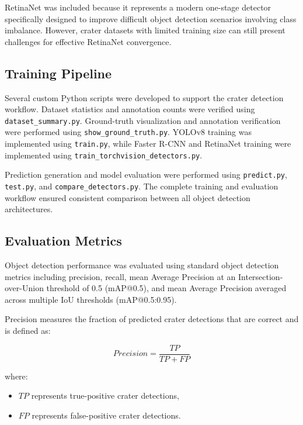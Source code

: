 \documentclass[conference]{IEEEtran}
\begin{document}
	RetinaNet was included because it represents a modern one-stage detector specifically designed to improve difficult object detection scenarios involving class imbalance. However, crater datasets with limited training size can still present challenges for effective RetinaNet convergence.
	
	\subsection{Training Pipeline}
	
	Several custom Python scripts were developed to support the crater detection workflow. Dataset statistics and annotation counts were verified using \texttt{dataset\_summary.py}. Ground-truth visualization and annotation verification were performed using \texttt{show\_ground\_truth.py}. YOLOv8 training was implemented using \texttt{train.py}, while Faster R-CNN and RetinaNet training were implemented using \texttt{train\_torchvision\_detectors.py}.
	
	Prediction generation and model evaluation were performed using \texttt{predict.py}, \texttt{test.py}, and \texttt{compare\_detectors.py}. The complete training and evaluation workflow ensured consistent comparison between all object detection architectures.
	
	\subsection{Evaluation Metrics}
	
	Object detection performance was evaluated using standard object detection metrics including precision, recall, mean Average Precision at an Intersection-over-Union threshold of 0.5 (mAP@0.5), and mean Average Precision averaged across multiple IoU thresholds (mAP@0.5:0.95).
	
	Precision measures the fraction of predicted crater detections that are correct and is defined as:
	
	\begin{equation}
		Precision = \frac{TP}{TP + FP}
	\end{equation}
	
	where:
	\begin{itemize}
		\item $TP$ represents true-positive crater detections,
		\item $FP$ represents false-positive crater detections.
	\end{itemize}
	
\end{document}
